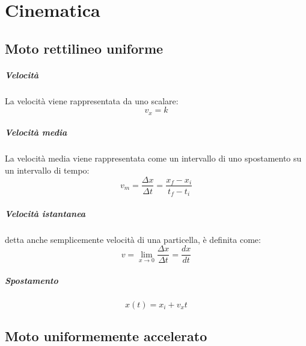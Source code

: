 \chapter{Cinematica}

    \section{Moto rettilineo uniforme}

        \paragraph{Velocità} 
            La velocità viene rappresentata da uno scalare:
            \begin{equation}
                v_x = k
            \end{equation}

        \paragraph{Velocità media} 
            La velocità media viene rappresentata come un intervallo di uno 
            spostamento su un intervallo di tempo:
            \begin{equation}
                v_m = \frac{\Delta x}{\Delta t} = \frac{x_f - x_i}{t_f - t_i}
            \end{equation}

        \paragraph{Velocità istantanea} detta anche semplicemente velocità di 
        una particella, è definita come:
            \begin{equation}
                v = \lim_{x \to 0}  \frac{\Delta x}{\Delta t} = \frac{dx}{dt}
            \end{equation}

        \paragraph{Spostamento}
            \begin{equation}
                x(t) = x_i + v_xt
            \end{equation}

    \section{Moto uniformemente accelerato}

